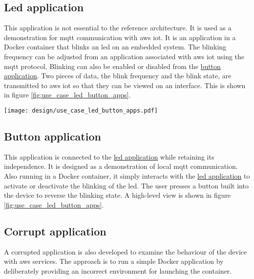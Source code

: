 \subsection{Led application}
\label{subsec:led_app}
This application is not essential to the reference architecture. It is used as a demonstration for \acrshort{mqtt} communication with \gls{aws} \acrshort{iot}. It is an application in a Docker container that blinks an led on an embedded system. The blinking frequency can be adjusted from an application associated with \gls{aws} \acrshort{iot} using the \acrshort{mqtt} protocol. Blinking can also be enabled or disabled from the \hyperref[subsec:button_app]{button application}. Two pieces of data, the blink frequency and the blink state, are transmitted to \gls{aws} \acrshort{iot} so that they can be viewed on an interface. This is shown in figure \ref{fig:use_case_led_button_apps}.
\begin{center}
    \begingroup
    \texttt{[image: design/use\_case\_led\_button\_apps.pdf]}
    \label{fig:use_case_led_button_apps}
    \endgroup
\end{center}

\subsection{Button application}
\label{subsec:button_app}
This application is connected to the \hyperref[subsec:led_app]{led application} while retaining its independence. It is designed as a demonstration of local \acrshort{mqtt} communication. Also running in a Docker container, it simply interacts with the \hyperref[subsec:led_app]{led application} to activate or deactivate the blinking of the led. The user presses a button built into the device to reverse the blinking state. A high-level view is shown in figure \ref{fig:use_case_led_button_apps}.

\subsection{Corrupt application}
A corrupted application is also developed to examine the behaviour of the device with \gls{aws} services. The approach is to run a simple Docker application by deliberately providing an incorrect environment for launching the container.